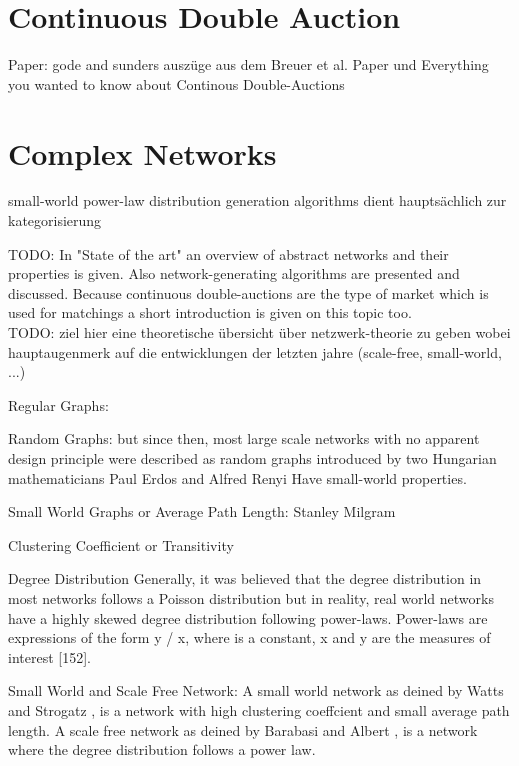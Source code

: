 \documentclass[../Bachelorarbeit.tex]{subfiles}
\begin{document}
\section{Continuous Double Auction}	
Paper: gode and sunders
auszüge aus dem Breuer et al. Paper und Everything you wanted to know about Continous Double-Auctions


\section{Complex Networks}
\label{sec:theory_complexNetworks}
small-world
power-law distribution
generation algorithms
dient hauptsächlich zur kategorisierung
		
TODO:
In "State of the art" an overview of abstract networks and their properties is given. Also network-generating algorithms are presented and discussed. Because continuous double-auctions are the type of market which is used for matchings a short introduction is given on this topic too.\\

TODO: ziel hier eine theoretische übersicht über  netzwerk-theorie zu geben wobei hauptaugenmerk auf die entwicklungen der letzten jahre (scale-free, small-world, ...)

Regular Graphs: \citep[vgl.]{BarabasiAlbert_StatisticalMechanics} \citep[vgl.]{Newman_ComplexNetworks}

Random Graphs: but since then, most large scale networks with no apparent design principle were described as random graphs introduced by two Hungarian mathematicians Paul Erdos and Alfred Renyi \citep[vgl.]{ErdosRenyi_RandomGraphs} \citep[vgl.]{ErdosRenyi_EvolutionRandomGraphs} Have small-world properties.

Small World Graphs or Average Path Length: Stanley Milgram \citep{TraverMilgram_StudySmallWorld} \citep{Milgram_SmallWorld} \citep{Kleinberg_SmallworldAlgorithmic}

Clustering Coefficient or Transitivity \citep{WattsStrogatz_DynamicsSmallWorld}

Degree Distribution \citep{BarabasiAlbert_EmergenceScaling} Generally, it was believed that the degree distribution in most networks follows a
Poisson distribution but in reality, real world networks have a highly skewed degree distribution following power-laws. Power-laws are expressions of the form y / x, where is a constant, x and y are the measures of interest [152].

Small World and Scale Free Network: A small world network as deined by Watts and Strogatz \cite{WattsStrogatz_DynamicsSmallWorld}, is a network with high clustering coeffcient and small average path length. A scale free network as deined by Barabasi and Albert \citep{BarabasiAlbert_EmergenceScaling}, is a network where the degree distribution follows a power law.
\end{document}

